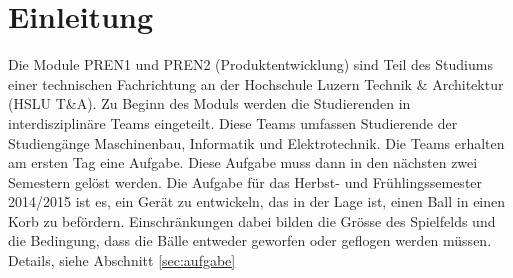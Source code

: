 \section{Einleitung}
Die Module PREN1 und PREN2 (Produktentwicklung) sind Teil des Studiums einer 
technischen Fachrichtung an der Hochschule Luzern Technik \& Architektur 
(HSLU T\&A). 
Zu Beginn des Moduls werden die Studierenden in interdisziplinäre Teams 
eingeteilt. Diese Teams umfassen Studierende der Studiengänge Maschinenbau, 
Informatik und Elektrotechnik. Die Teams erhalten am ersten Tag eine Aufgabe. 
Diese Aufgabe muss dann in den nächsten zwei Semestern gelöst werden. 
Die Aufgabe für das Herbst- und Frühlingssemester 2014/2015 ist es, ein Gerät
zu entwickeln, das in der Lage ist, einen Ball in einen Korb zu befördern.
Einschränkungen dabei bilden die Grösse des Spielfelds und die Bedingung, dass
die Bälle entweder geworfen oder geflogen werden müssen. 
Details, siehe Abschnitt \ref{sec:aufgabe}
